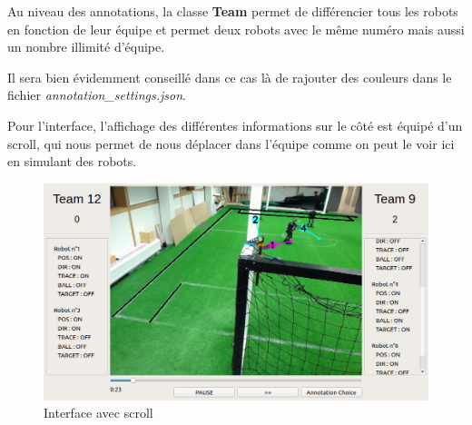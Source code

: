 Au niveau des annotations, la classe \textbf{Team} permet de 
différencier tous les robots en fonction de leur équipe et 
permet deux robots avec le même numéro mais aussi un nombre 
illimité d'équipe.

Il sera bien évidemment conseillé dans ce cas là de rajouter 
des couleurs dans le fichier 
\textit{annotation\_settings.json}.
\bigskip

Pour l'interface, l'affichage des différentes informations sur
le côté est équipé d'un scroll, qui nous permet de nous
déplacer dans l'équipe comme on peut le voir ici en simulant 
des robots.

\begin{figure}[H] 
\centering 
\includegraphics[scale = 0.4]{images/interfacescroll.png}
    \caption{Interface avec scroll}
    \label{fig:scroll}
\end{figure} 
\bigskip


